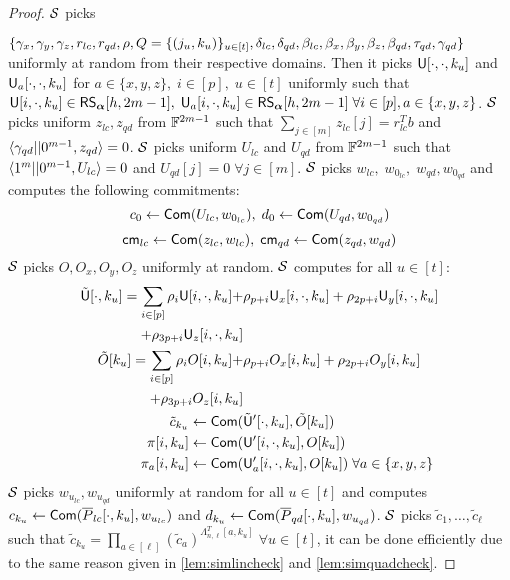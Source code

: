 \begin{proof}
	 $\mathcal{S}$ picks 
	
		$\{\gamma_x, \gamma_y, \gamma_z, r_{lc}, r_{qd}, \rho, Q=\{(j_u,k_u)\}_{u\in[t]}, \delta_{lc}, \delta_{qd}, \beta_{lc},\\ \beta_x, \beta_y, \beta_z, \beta_{qd}, \tau_{qd}, \gamma_{qd}\}$ uniformly at random from their respective domains. Then it picks $\mathsf{U}[\cdot,\cdot, k_u]$ and $\mathsf{U}_a[\cdot,\cdot,k_u]$ for $a\in\{x,y,z\}, \; i\in[p],\; u\in[t]$ uniformly such that $\mathsf{U}[i,\cdot, k_u] \in \mathsf{RS}_{\bm{\alpha}}[h,2m-1], \; \mathsf{U}_a[i,\cdot,k_u]\in \mathsf{RS}_{\bm{\alpha}}[h,2m-1]\; \forall i\in[p], a\in\{x,y,z\}$.
		$\mathcal{S}$ picks uniform $z_{lc}, z_{qd}$ from $\mathbb{F}^{2m-1}$ such that $\sum_{j\in[m]} z_{lc}[j] = r_{lc}^Tb$ and $\langle \gamma_{qd}||0^{m-1},z_{qd}\rangle = 0$.
		$\mathcal{S}$ picks uniform $U_{lc}$ and $U_{qd}$ from $\mathbb{F}^{2m-1}$ such that $\langle 1^m||0^{m-1},U_{lc}\rangle = 0$ and $U_{qd}[j]=0 \; \forall j\in[m]$. $\mathcal{S}$ picks $w_{lc},\;w_{0_{lc}}, \;w_{qd},w_{0_{qd}}$ and computes the following commitments: 
		$$c_0\leftarrow \mathsf{Com}(U_{lc},w_{0_{lc}}), \; d_0\leftarrow \mathsf{Com}(U_{qd},w_{0_{qd}})$$ 
		$$\mathsf{cm}_{lc} \leftarrow \mathsf{Com}(z_{lc},w_{lc}), \; \mathsf{cm}_{qd} \leftarrow \mathsf{Com}(z_{qd},w_{qd})$$
		$\mathcal{S}$ picks $O, O_x, O_y, O_z$ uniformly at random. $\mathcal{S}$ computes for all $u\in[t]$:
		\begin{align*}
			\tilde{\mathsf{U}}[\cdot,k_u]= \sum_{i\in[p]} \rho_i\mathsf{U}[i,\cdot, k_u]+ &\rho_{p+i} \mathsf{U}_x[i,\cdot,k_u] + \rho_{2p+i} \mathsf{U}_y[i,\cdot,k_u]\\ + \rho_{3p+i} \mathsf{U}_z[i,\cdot,k_u]\\
			\tilde{O}[k_u]= \sum_{i\in[p]} \rho_i O[i, k_u]+ &\rho_{p+i} O_x[i,k_u] + \rho_{2p+i} O_y[i,k_u]\\ + \rho_{3p+i} O_z[i,k_u]\\
			\tilde{c}_{k_u} \leftarrow \mathsf{Com}(&\tilde{\mathsf{U}}'[\cdot,k_u], \tilde{O}[k_u])\\
			\pi[i,k_u]\leftarrow \mathsf{Com}(&\mathsf{U}'[i,\cdot,k_u], O[k_u])\\
			\pi_a[i,k_u]\leftarrow \mathsf{Com}(&\mathsf{U}_a'[i,\cdot,k_u], O[k_u])\; \forall a\in\{x,y,z\}
		\end{align*}
		$\mathcal{S}$ picks $w_{u_{lc}}, w_{u_{qd}}$ uniformly at random for all $u\in[t]$ and computes $c_{k_u}\leftarrow \mathsf{Com}(\overline{P}_{lc}[\cdot, k_u], w_{u_{lc}})$ and $d_{k_u}\leftarrow \mathsf{Com}(\overline{P}_{qd}[\cdot, k_u], w_{u_{qd}})$.
		$\mathcal{S}$ picks $\tilde{c}_1,\ldots,\tilde{c}_{\ell}$ such that $\tilde{c}_{k_u} = \prod_{a\in [\ell]} (\tilde{c}_a)^{\Lambda_{n,\ell}^T[a,k_u]}\; \forall u\in[t]$, it can be done efficiently due to the same reason given in \ref{lem:simlincheck} and \ref{lem:simquadcheck}.

\end{proof}
